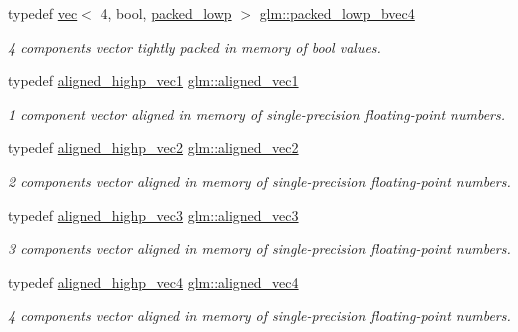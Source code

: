 \begin{DoxyCompactItemize}
typedef \mbox{\hyperlink{structglm_1_1vec}{vec}}$<$ 4, bool, \mbox{\hyperlink{namespaceglm_a36ed105b07c7746804d7fdc7cc90ff25ac36a4bd74559be2c0b65bc48e5953b8b}{packed\+\_\+lowp}} $>$ \mbox{\hyperlink{group__gtc__type__aligned_ga7340a9bf8a974a263c6eaef48133331c}{glm\+::packed\+\_\+lowp\+\_\+bvec4}}
\begin{DoxyCompactList}\small\item\em 4 components vector tightly packed in memory of bool values. \end{DoxyCompactList}\item 
typedef \mbox{\hyperlink{group__gtc__type__aligned_ga8da7535c1fe488b2b9a29c0c05e7b17e}{aligned\+\_\+highp\+\_\+vec1}} \mbox{\hyperlink{group__gtc__type__aligned_ga8cf75c112dfa39264b7ef65c2ed6b3c4}{glm\+::aligned\+\_\+vec1}}
\begin{DoxyCompactList}\small\item\em 1 component vector aligned in memory of single-\/precision floating-\/point numbers. \end{DoxyCompactList}\item 
typedef \mbox{\hyperlink{group__gtc__type__aligned_ga7467c1a16f31911de3b927338434af6d}{aligned\+\_\+highp\+\_\+vec2}} \mbox{\hyperlink{group__gtc__type__aligned_ga8f4a38f220c72d218dbdc7bc1d06a1a2}{glm\+::aligned\+\_\+vec2}}
\begin{DoxyCompactList}\small\item\em 2 components vector aligned in memory of single-\/precision floating-\/point numbers. \end{DoxyCompactList}\item 
typedef \mbox{\hyperlink{group__gtc__type__aligned_ga9ddb18aa4936b5aa354fcefe179675af}{aligned\+\_\+highp\+\_\+vec3}} \mbox{\hyperlink{group__gtc__type__aligned_ga9c54536a3becfd10a44f6b1b8c4aa3d3}{glm\+::aligned\+\_\+vec3}}
\begin{DoxyCompactList}\small\item\em 3 components vector aligned in memory of single-\/precision floating-\/point numbers. \end{DoxyCompactList}\item 
typedef \mbox{\hyperlink{group__gtc__type__aligned_ga60d6561b0daa150c617f3a7a277e44ee}{aligned\+\_\+highp\+\_\+vec4}} \mbox{\hyperlink{group__gtc__type__aligned_gad26d520694d7b865507819c2d9f2b196}{glm\+::aligned\+\_\+vec4}}
\begin{DoxyCompactList}\small\item\em 4 components vector aligned in memory of single-\/precision floating-\/point numbers. \end{DoxyCompactList}\item 

\end{DoxyCompactItemize}
